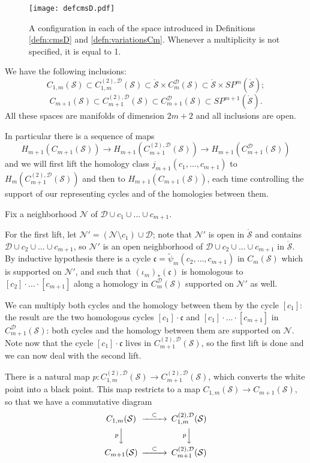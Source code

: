 \documentclass{amsart}
\theoremstyle{plain}
\theoremstyle{definition}
\newcommand{\fc}{\mathfrak{c}}
\newcommand{\D}{\mathcal{D}}
\newcommand{\N}{\mathcal{N}}
\newcommand{\p}{p}
\renewcommand{\S}{\mathcal{S}}
\newcommand{\cms}{C_m(\S)}
\newcommand{\cmsD}{C_{m}^{\D}(\S)}
\newcommand{\fmstwoD}{C_{1,m}^{(2),\D}(\S)}
\newcommand{\cmstwoD}{C_{m+1}^{(2),\D}(\S)}
\newcommand{\tpsi}{\tilde\psi}
\newcommand{\pa}[1]{\left(#1\right)}
\newcommand{\mrS}{\mathring{\S}}
\newcommand{\SP}{S\!P}
\begin{document}
\begin{figure}[ht]\centering
 \texttt{[image: defcmsD.pdf]}
 \caption{A configuration in each of the space introduced in Definitions \ref{defn:cmsD} and \ref{defn:variationsCm}.
 Whenever a multiplicity is not specified, it is equal to 1.}
\label{fig:defcmsD}
\end{figure}

 
We have the following inclusions:
\[
C_{1,m}(\S)\subset\fmstwoD\subset\mrS\times\cmsD\subset\mrS\times\SP^m(\mrS);
\]
\[
C_{m+1}(\S)\subset\cmstwoD\subset C_{m+1}^{\D}(\S)\subset\SP^{m+1}(\mrS).
\]
All these spaces are
manifolds of dimension $2m+2$ and all inclusions are open.

In particular there is a sequence of maps
\[
 H_{m+1}\pa{C_{m+1}(\S)}\to H_{m+1}\pa{\cmstwoD}\to H_{m+1}\pa{C_{m+1}^{\D}(\S)}
\]
and we will first lift the homology class $j_{m+1}(c_1,\dots,c_{m+1})$ to $H_m\pa{\cmstwoD}$ and
then to $H_{m+1}(C_{m+1}(\S))$, each time controlling the support of our representing
cycles and of the homologies between them.

Fix a neighborhood $\N$ of $\D\cup c_1\cup\dots\cup c_{m+1}$.

For the first lift, let $\N'=\pa{\N\setminus c_1}\cup\D$; note that $\N'$ is open
in $\mrS$ and contains $\D\cup c_2\cup\dots\cup c_{m+1}$, so $\N'$ is an open
neighborhood of $\D\cup c_2\cup\dots\cup c_{m+1}$ in $\mrS$. By inductive hypothesis
there is a cycle $\fc=\tpsi_m(c_2,\dots,c_{m+1})$ in $\cms$ which is supported on $\N'$,
and such that $(\iota_m)_*(\fc)$ is homologous to $[c_2]\cdot\ldots\cdot[c_{m+1}]$
along a homology in $\cmsD$ supported on $\N'$ as well.

We can multiply both
cycles and the homology between them by the cycle $[c_1]$: the result are the two homologous cycles
$[c_1]\cdot \fc$ and $[c_1]\cdot\ldots\cdot[c_{m+1}]$ in $C_{m+1}^{\D}(\S)$: both cycles and the
homology between them are supported on $\N$. Note now that the
cycle $[c_1]\cdot\fc$ lives in $\cmstwoD$, so the first lift is done and we can now
deal with the second lift.

There is a natural map $\p\colon \fmstwoD\to \cmstwoD$, which converts the white point
into a black point. This map restricts to %
a map $C_{1,m}(\S)\to C_{m+1}(\S)$, so that
we have a commutative diagram
 \begin{equation}\label{eq:cmstwodiagram}
  \begin{CD}
   C_{1,m}(\S) @>\subset >> \fmstwoD
\\   @V\p VV @V\p VV
\\   C_{m+1}(\S) @>\subset >> \cmstwoD
   \end{CD}
\end{equation}
\end{document}
